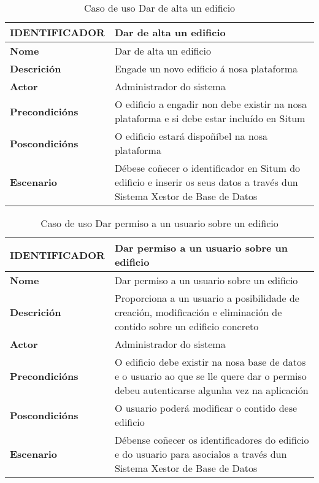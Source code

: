 \begin{table}[tbp]
	\begin{tabular}{|l|p{10cm}|}
		\hline 
		\textbf{IDENTIFICADOR}	& \textbf{Dar de alta un edificio} \\ 
		\hline 
		\textbf{Nome} & Dar de alta un edificio \\ 
		\hline 
		\textbf{Descrición} & Engade un novo edificio á nosa plataforma \\ 
		\hline 
		\textbf{Actor} & Administrador do sistema \\ 
		\hline 
		\textbf{Precondicións} & O edificio a engadir non debe existir na nosa plataforma e si debe estar incluído en Situm \\ 
		\hline 
		\textbf{Poscondicións} & O edificio estará dispoñíbel na nosa plataforma \\ 
		\hline 
		\textbf{Escenario} & Débese coñecer o identificador en Situm do edificio e inserir os seus datos a través dun Sistema Xestor de Base de Datos \\ 
		\hline 
	\end{tabular}
	\caption{Caso de uso Dar de alta un edificio}
	\label{tab:cuAltaEdificio}
\end{table}

\begin{table}[tbp]
	\begin{tabular}{|l|p{10cm}|}
		\hline 
		\textbf{IDENTIFICADOR}	& \textbf{Dar permiso a un usuario sobre un edificio} \\ 
		\hline 
		\textbf{Nome} & Dar permiso a un usuario sobre un edificio \\ 
		\hline 
		\textbf{Descrición} & Proporciona a un usuario a posibilidade de creación, modificación e eliminación de contido sobre un edificio concreto \\ 
		\hline 
		\textbf{Actor} & Administrador do sistema \\ 
		\hline 
		\textbf{Precondicións} & O edificio debe existir na nosa base de datos e o usuario ao que se lle quere dar o permiso debeu autenticarse algunha vez na aplicación \\ 
		\hline 
		\textbf{Poscondicións} & O usuario poderá modificar o contido dese edificio \\ 
		\hline 
		\textbf{Escenario} & Débense coñecer os identificadores do edificio e do usuario para asocialos a través dun Sistema Xestor de Base de Datos \\ 
		\hline 
	\end{tabular}
	\caption{Caso de uso Dar permiso a un usuario sobre un edificio}
	\label{tab:cuDarPermisoUsuarioEdificio}
\end{table}

